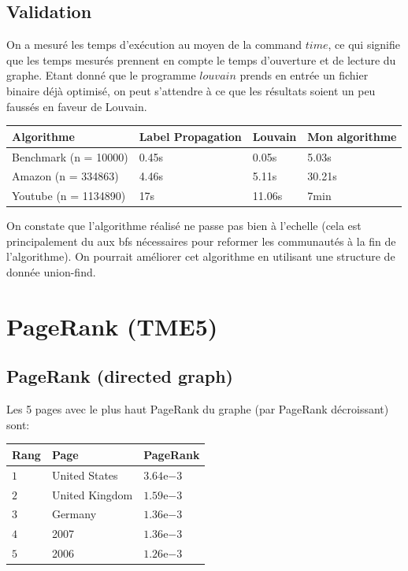 \documentclass[a4paper]{report}
\begin{document}
\section{Validation}

On a mesuré les temps d'exécution au moyen de la command $time$, ce qui signifie que les temps mesurés prennent en compte le temps d'ouverture et de lecture du graphe. Etant donné que le programme $louvain$ prends en entrée un fichier binaire déjà optimisé, on peut s'attendre à ce que les résultats soient un peu faussés en faveur de Louvain.

\begin{center}
  \begin{tabular}{|l|l|l|l|}
    \hline
    Algorithme & Label Propagation & Louvain & Mon algorithme\\
    \hline
    Benchmark (n = 10000) & 0.45s & 0.05s & 5.03s\\
    Amazon (n = 334863) & 4.46s & 5.11s & 30.21s\\
    Youtube (n = 1134890) & 17s & 11.06s & 7min\\
    \hline
  \end{tabular}
\end{center}

On constate que l'algorithme réalisé ne passe pas bien à l'echelle (cela est principalement du aux bfs nécessaires pour reformer les communautés à la fin de l'algorithme). On pourrait améliorer cet algorithme en utilisant une structure de donnée union-find.

\chapter{PageRank (TME5)}

\section{PageRank (directed graph)}

Les 5 pages avec le plus haut PageRank du graphe (par PageRank décroissant) sont:

\begin{center}
  \begin{tabular}{|l|l|l|}
    \hline
    Rang & Page & PageRank\\
    \hline
    $1$ & United States & $3.64\mathrm{e}{-3}$\\
    $2$ & United Kingdom & $1.59\mathrm{e}{-3}$\\
    $3$ & Germany & $1.36\mathrm{e}{-3}$\\
    $4$ & 2007 & $1.36\mathrm{e}{-3}$\\
    $5$ & 2006 & $1.26\mathrm{e}{-3}$\\
    \hline
  \end{tabular}
\end{center}
\end{document}
